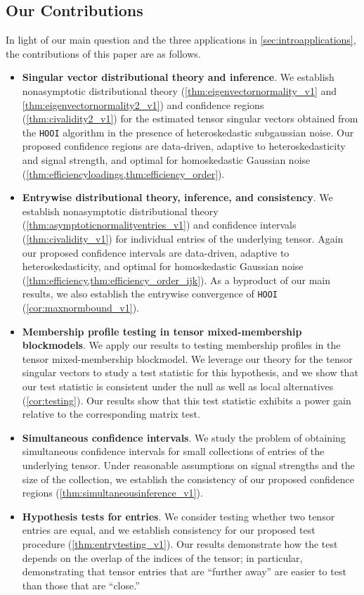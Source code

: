 \documentclass[10pt]{article}
\newcommand{\0}{{\mathbf{0}}}
\newcommand{\1}{{\mathbf{1}}}
\begin{document}
\subsection{Our Contributions}
In light of our main question and the three applications in \cref{sec:introapplications}, the contributions of this paper are as follows.
\begin{itemize}
    \item \textbf{Singular vector distributional theory and inference}. We establish nonasymptotic distributional theory (\cref{thm:eigenvectornormality_v1} and \cref{thm:eigenvectornormality2_v1}) and confidence regions (\cref{thm:civalidity2_v1}) for the estimated tensor singular vectors obtained from the \texttt{HOOI} algorithm in the presence of heteroskedastic  subgaussian noise.  Our proposed confidence regions are data-driven, adaptive to heteroskedasticity and signal strength, and optimal for homoskedastic Gaussian noise (\cref{thm:efficiencyloadings,thm:efficiency_order}).  
    \item \textbf{Entrywise distributional theory, inference, and consistency}.  We establish nonasymptotic distributional theory (\cref{thm:asymptoticnormalityentries_v1}) and confidence intervals (\cref{thm:civalidity_v1}) for individual entries of the underlying tensor.  Again our proposed confidence intervals are   data-driven, adaptive to heteroskedasticity, and optimal for homoskedastic Gaussian noise (\cref{thm:efficiency,thm:efficiency_order_ijk}).   As a byproduct of our main results, we also establish the entrywise convergence of \texttt{HOOI} (\cref{cor:maxnormbound_v1}).  
    \item \textbf{Membership profile testing in tensor mixed-membership blockmodels}. We apply our results to  testing membership profiles in the tensor mixed-membership blockmodel.  We leverage our theory for the tensor singular vectors to study a test statistic for this hypothesis, and we show that our test statistic is consistent under the null as well as local alternatives (\cref{cor:testing}).  Our results show that this test statistic exhibits a power gain relative to the corresponding matrix test.  
    \item \textbf{Simultaneous confidence intervals}.  We study the problem of obtaining simultaneous confidence intervals for small collections of entries of the underlying tensor. Under reasonable assumptions on signal strengths and the size of the collection, we establish the consistency of our proposed confidence regions (\cref{thm:simultaneousinference_v1}).
    \item \textbf{Hypothesis tests for entries}.  We consider testing whether two tensor entries are equal, and we establish consistency for our proposed test procedure (\cref{thm:entrytesting_v1}).  Our results demonstrate  how the test depends on the overlap of the indices of the tensor; in particular, demonstrating that tensor entries that are ``further away'' are easier to test than those that are ``close.''
    \end{itemize}
\end{document}
